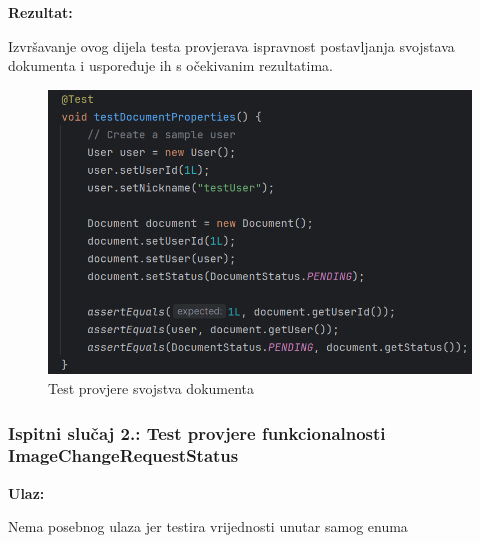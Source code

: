                         \noindent\textbf{Rezultat:}
                        \begin{packed_item}
                        	\item  Izvršavanje ovog dijela testa provjerava ispravnost postavljanja svojstava dokumenta i uspoređuje ih s očekivanim rezultatima.
                        \end{packed_item}
                       \begin{figure} [H]
                       	\centering
                       	\includegraphics[width=0.7\linewidth]{slike/DokumentTest.png}
                       	\caption{Test provjere svojstva dokumenta}
                       	\label{fig:Test provjere svojstva dokumenta}
                       \end{figure}
                      



            \subsubsection{Ispitni slučaj 2.: Test provjere funkcionalnosti ImageChangeRequestStatus}

                                    \noindent\textbf{Ulaz:}
                                    \begin{packed_item}
                                    	\item Nema posebnog ulaza jer testira vrijednosti unutar samog enuma
                                    \end{packed_item}
                      
